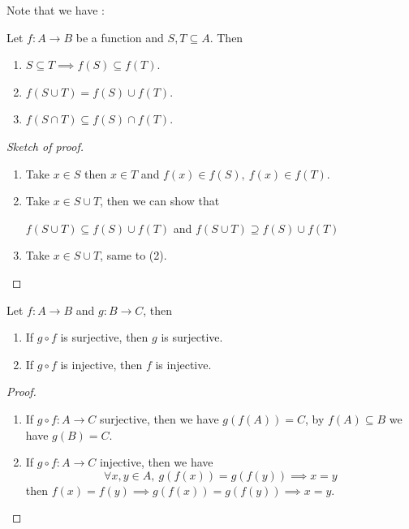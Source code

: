 \documentclass[
	UTF-8,
	11pt, %
	a4paper, %
]{LegrandOrangeBook}
\begin{document}
Note that we have :

\begin{proposition}
    Let $f : A \to B$ be a function and $S,T \subseteq A$. Then
    \begin{enumerate}
        \item $S \subseteq T \implies f(S) \subseteq f(T)$.
        \item $f(S \cup T) = f(S) \cup f(T)$.
        \item $f(S \cap T) \subseteq f(S)\cap f(T)$.
    \end{enumerate}
\end{proposition}

\begin{proof}[Sketch of proof]\quad
    \begin{enumerate}
        \item Take $x \in S$ then $x \in T$ and $f(x) \in f(S),\ f(x) \in f(T)$.
        \item Take $x \in S \cup T$, then we can show that
        \begin{center}
            $f(S \cup T) \subseteq f(S) \cup f(T)$ and $f(S \cup T) \supseteq f(S) \cup f(T)$
        \end{center}
        \item Take $x \in S \cup T$, same to (2).
    \end{enumerate}
    \end{proof}

\begin{theorem}
        Let $f : A \to B$ and $g : B \to C$, then
        \begin{enumerate}
            \item If $g \circ f$ is surjective, then $g$ is surjective.
            \item If $g \circ f$ is injective, then $f$ is injective.
        \end{enumerate}
    \end{theorem}

    \begin{proof}\quad
        \begin{enumerate}
            \item If $g \circ f : A \to C$ surjective, then we have $g(f(A)) = C$, by $f(A) \subseteq B$ 
        we have $g(B) = C$.
            \item If $g \circ f : A \to C$ injective, then we have 
            $$\forall x,y \in A,\ g(f(x)) = g(f(y)) \implies x =y$$
            then $f(x) = f(y) \implies g(f(x)) = g(f(y)) \implies x = y$.
        \end{enumerate}
        
    \end{proof}
\end{document}
